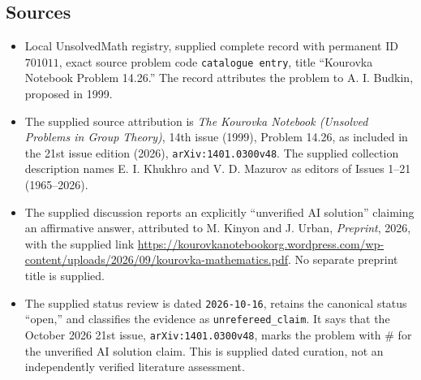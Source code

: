 \documentclass[11pt]{article}
\begin{document}
\subsection{Sources}
\begin{itemize}
\item Local UnsolvedMath registry, supplied complete record with permanent ID \(701011\), exact source problem code \texttt{catalogue entry}, title ``Kourovka Notebook Problem 14.26.'' The record attributes the problem to A. I. Budkin, proposed in 1999.
\item The supplied source attribution is \emph{The Kourovka Notebook (Unsolved Problems in Group Theory)}, 14th issue (1999), Problem 14.26, as included in the 21st issue edition (2026), \texttt{arXiv:1401.0300v48}. The supplied collection description names E. I. Khukhro and V. D. Mazurov as editors of Issues 1--21 (1965--2026).
\item The supplied discussion reports an explicitly ``unverified AI solution'' claiming an affirmative answer, attributed to M. Kinyon and J. Urban, \emph{Preprint}, 2026, with the supplied link \url{https://kourovkanotebookorg.wordpress.com/wp-content/uploads/2026/09/kourovka-mathematics.pdf}. No separate preprint title is supplied.
\item The supplied status review is dated \texttt{2026-10-16}, retains the canonical status ``open,'' and classifies the evidence as \texttt{unrefereed\_claim}. It says that the October 2026 21st issue, \texttt{arXiv:1401.0300v48}, marks the problem with \(\#\) for the unverified AI solution claim. This is supplied dated curation, not an independently verified literature assessment.
\end{itemize}
\end{document}
